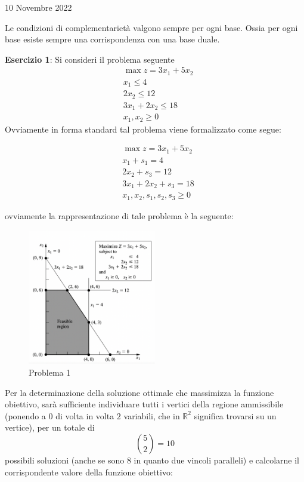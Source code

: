 \documentclass[a4paper]{extarticle}
\begin{document}
\newpage
\begin{center}
    10 Novembre 2022
\end{center}
Le condizioni di complementarietà valgono sempre per ogni base. Ossia per ogni base esiste sempre  una corrispondenza con una base duale.

\vspace{1em}
\noindent
\textbf{Esercizio 1}: Si consideri il problema seguente
\begin{align*}
    &\max z = 3x_1 + 5x_2\\
    & x_1 \leq 4\\
    & 2x_2 \leq 12\\
    & 3x_1 + 2x_2 \leq 18\\
    & x_1,x_2 \geq 0
\end{align*}
Ovviamente in forma standard tal problema viene formalizzato come segue:

\begin{align*}
    &\max z = 3x_1 + 5x_2\\
    & x_1 + s_1 = 4\\
    & 2x_2 + s_3 = 12\\
    & 3x_1 + 2x_2 + s_3 = 18\\
    & x_1,x_2,s_1,s_2,s_3 \geq 0
\end{align*}

\vspace{1em}
\noindent
ovviamente la rappresentazione di tale problema è la seguente:

\begin{figure}[H]
    \centering
    \includegraphics[width=0.5\textwidth]{Frontiera_vincolo_soluzioni_vertice.png}
    \caption{Problema 1}
    \label{fig:fig3}
\end{figure}

\vspace{1em}
\noindent
Per la determinazione della soluzione ottimale che massimizza la funzione obiettivo, sarà sufficiente individuare tutti i vertici della regione ammissibile (ponendo a $0$ di volta in volta $2$ variabili, che in $\mathbb{R}^2$ significa trovarsi su un vertice), per un totale di
\[\binom{5}{2} = 10\]
possibili soluzioni (anche se sono $8$ in quanto due vincoli paralleli) e calcolarne il corrispondente valore della funzione obiettivo:
\end{document}
